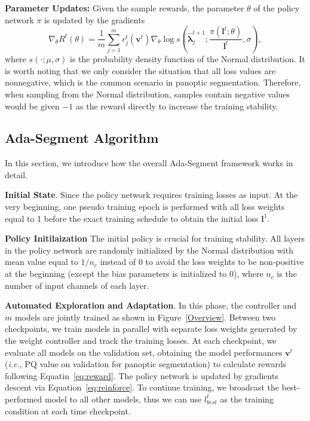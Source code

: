 \documentclass[letterpaper]{article} \usepackage{aaai21}  \usepackage{times}  \usepackage{helvet} \usepackage{courier}  \usepackage[hyphens]{url}  \usepackage{graphicx} \urlstyle{rm} \def\UrlFont{\rm}  \usepackage{natbib}  \usepackage{caption} \frenchspacing  \setlength{\pdfpagewidth}{8.5in}  \setlength{\pdfpageheight}{11in}
\begin{document}
 \textbf{Parameter Updates:}
 Given the sample rewards, the parameter $\theta$ of the policy network $\pi$ is updated by 
 the gradients 
 \begin{equation}\nabla_{\theta}R^t(\theta)=\frac{1}{m}\sum_{j=1}^{m}
 {r^t_j(\boldsymbol{v}^t)\nabla_{\theta}\log{s(\boldsymbol{\hat\lambda}^{t+1}_j;
 \frac{\pi(\boldsymbol{l}^t; \theta)}{\boldsymbol{l}^t}, \sigma)}},\label{eq:reinforce}\end{equation}
 where $s(\cdot;\mu,\sigma)$ is the probability density function of the Normal distribution.
 It is worth noting that we only consider the situation that all loss values are nonnegative,
 which is the common scenario in panoptic segmentation. 
 Therefore, when sampling from the Normal distribution, 
 samples contain negative values would be given $-1$ as the reward directly to increase the training stability. 















 \subsection{Ada-Segment Algorithm} 
 \label{sec:ada-segment-alg}
 In this section, we introduce how the overall Ada-Segment framework works in detail. 

 \noindent
 \textbf{Initial State}. 
 Since the policy network requires training losses as input. At the very beginning, 
 one pseudo training epoch is performed with all loss weights equal to 1 before the exact training schedule
 to obtain the initial loss $\boldsymbol{l}^1$. 

 \noindent
 \textbf{Policy Initilaization} The initial policy is crucial for training stability. 
 All layers in the policy network are randomly initialized 
 by the Normal distribution with mean value equal to $1/n_c$ instead of $0$ to avoid the loss weights 
 to be non-positive at the beginning (except the bias parameters is initialized to 0), 
 where $n_c$ is the number of input channels of each layer.

 \noindent
 \textbf{Automated Exploration and Adaptation}.
 In this phase, the controller and $m$ models are jointly trained as shown in Figure~\ref{Overview}. 
 Between two checkpoints, we train models in parallel with 
 separate loss weights generated by the weight controller and track the training losses. 
 At each checkpoint, we evaluate all models on the validation set,
 obtaining the model performances $\boldsymbol{v}^t$ (\textit{i.e.}, PQ value on validation for panoptic segmentation)
 to calculate rewards following Equatin~\ref{eq:reward}.
 The policy network is  
 updated by gradients descent via Equation~\ref{eq:reinforce}. 
To continue training, 
 we broadcast the best-performed model to all other models,
 thus we can use $l^t_{best}$ as the training condition at each time checkpoint. 
\end{document}
